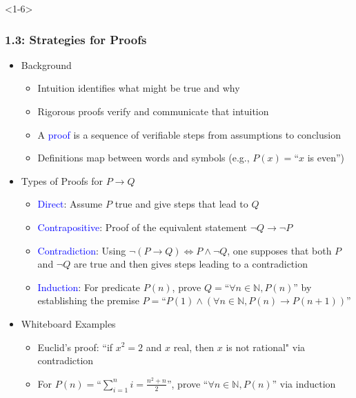 \documentclass[10pt,english,aspectratio=169]{beamer}
\begin{document}
\begin{frame}<1-6> \frametitle{1.3: Strategies for Proofs}

\begin{itemize}
\setlength\itemsep{2.5mm}
\item<1-> Background \vspace{1mm}
\begin{itemize} 
 \setlength\itemsep{1.25mm}
 \item Intuition identifies what might be true and why
 \item Rigorous proofs verify and communicate that intuition
 \item A \textcolor{blue}{proof} is a sequence of verifiable steps from assumptions to conclusion
 \item Definitions map between words and symbols (e.g., $P(x)=$``$x$ is even'') 
\end{itemize}

\item<2-> Types of Proofs for $P \rightarrow Q$  \vspace{1mm}
\begin{itemize} 
 \setlength\itemsep{1.25mm}
 \item<2-> \textcolor{blue}{Direct}: Assume $P$ true and give steps that lead to $Q$
 \item<3-> \textcolor{blue}{Contrapositive}: Proof of the equivalent statement $\neg Q \rightarrow \neg P$
 \item<4-> \textcolor{blue}{Contradiction}: Using $\neg (P \rightarrow Q) \Leftrightarrow P \wedge \neg Q$, one supposes that both $P$ and $\neg Q$ are true and then gives steps leading to a contradiction
 \item<5-> \textcolor{blue}{Induction}: For predicate $P(n)$, prove $Q=$``$\forall n\in\mathbb{N}, P(n)$'' by establishing the premise $P=$``$P(1) \wedge (\forall n\in \mathbb{N}, P(n) \rightarrow P(n\!+\!1))$''
\end{itemize}

\item<6-> Whiteboard Examples \vspace{1mm}
\begin{itemize} 
 \setlength\itemsep{1.25mm}
 \item Euclid's proof: ``if $x^2 = 2$ and $x$ real, then $x$ is not rational" via contradiction$\!\!\!\!\!\!\!$
 \item For $P(n)=$``$\sum_{i=1}^n i = \frac{n^2 + n}{2}$'', prove ``$\forall n\in \mathbb{N}, P(n)$'' via induction
\end{itemize}
\end{itemize}


\end{frame}
\end{document}
